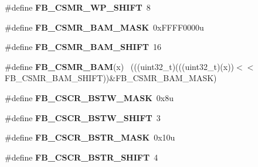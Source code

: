 \begin{DoxyCompactItemize}
\item 
\hypertarget{group___f_b___register___masks_ga6d49da1d3aabbb8619673ac0fba95dd1}{}\#define {\bfseries F\+B\+\_\+\+C\+S\+M\+R\+\_\+\+W\+P\+\_\+\+S\+H\+I\+F\+T}~8\label{group___f_b___register___masks_ga6d49da1d3aabbb8619673ac0fba95dd1}

\item 
\hypertarget{group___f_b___register___masks_ga9f7361c70716e7a39579b6418ae2c20c}{}\#define {\bfseries F\+B\+\_\+\+C\+S\+M\+R\+\_\+\+B\+A\+M\+\_\+\+M\+A\+S\+K}~0x\+F\+F\+F\+F0000u\label{group___f_b___register___masks_ga9f7361c70716e7a39579b6418ae2c20c}

\item 
\hypertarget{group___f_b___register___masks_ga6a99aa1f2614f6287dfa8a83a2ceead4}{}\#define {\bfseries F\+B\+\_\+\+C\+S\+M\+R\+\_\+\+B\+A\+M\+\_\+\+S\+H\+I\+F\+T}~16\label{group___f_b___register___masks_ga6a99aa1f2614f6287dfa8a83a2ceead4}

\item 
\hypertarget{group___f_b___register___masks_gab94aedc10ef3b8b17b129f69eda436c4}{}\#define {\bfseries F\+B\+\_\+\+C\+S\+M\+R\+\_\+\+B\+A\+M}(x)                                                  ~(((uint32\+\_\+t)(((uint32\+\_\+t)(x))$<$$<$F\+B\+\_\+\+C\+S\+M\+R\+\_\+\+B\+A\+M\+\_\+\+S\+H\+I\+F\+T))\&F\+B\+\_\+\+C\+S\+M\+R\+\_\+\+B\+A\+M\+\_\+\+M\+A\+S\+K)\label{group___f_b___register___masks_gab94aedc10ef3b8b17b129f69eda436c4}

\item 
\hypertarget{group___f_b___register___masks_gaee04052f66392a6242d45c0598b8606a}{}\#define {\bfseries F\+B\+\_\+\+C\+S\+C\+R\+\_\+\+B\+S\+T\+W\+\_\+\+M\+A\+S\+K}~0x8u\label{group___f_b___register___masks_gaee04052f66392a6242d45c0598b8606a}

\item 
\hypertarget{group___f_b___register___masks_ga34341b855043b3fbffcad2811084fec8}{}\#define {\bfseries F\+B\+\_\+\+C\+S\+C\+R\+\_\+\+B\+S\+T\+W\+\_\+\+S\+H\+I\+F\+T}~3\label{group___f_b___register___masks_ga34341b855043b3fbffcad2811084fec8}

\item 
\hypertarget{group___f_b___register___masks_gac577e626a579979985c559866c940018}{}\#define {\bfseries F\+B\+\_\+\+C\+S\+C\+R\+\_\+\+B\+S\+T\+R\+\_\+\+M\+A\+S\+K}~0x10u\label{group___f_b___register___masks_gac577e626a579979985c559866c940018}

\item 
\hypertarget{group___f_b___register___masks_ga161827d21e9f36d9dc4a42a3fc287dd7}{}\#define {\bfseries F\+B\+\_\+\+C\+S\+C\+R\+\_\+\+B\+S\+T\+R\+\_\+\+S\+H\+I\+F\+T}~4\label{group___f_b___register___masks_ga161827d21e9f36d9dc4a42a3fc287dd7}


\end{DoxyCompactItemize}
